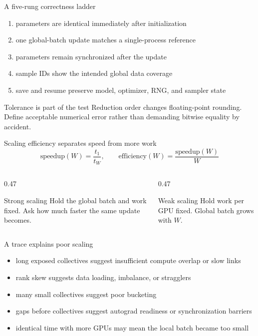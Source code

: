 \documentclass[handout]{beamer}
\begin{document}
\begin{frame}{A five-rung correctness ladder}
  \begin{enumerate}
    \setlength{\itemsep}{5pt}
    \item parameters are identical immediately after initialization
    \item one global-batch update matches a single-process reference
    \item parameters remain synchronized after the update
    \item sample IDs show the intended global data coverage
    \item save and resume preserve model, optimizer, RNG, and sampler state
  \end{enumerate}
  \begin{alertblock}{Tolerance is part of the test}
    Reduction order changes floating-point rounding. Define acceptable numerical error rather than demanding bitwise equality by accident.
  \end{alertblock}
\end{frame}

\begin{frame}{Scaling efficiency separates speed from more work}
  \[
    \text{speedup}(W)=\frac{t_1}{t_W},
    \qquad
    \text{efficiency}(W)=\frac{\text{speedup}(W)}{W}
  \]
  \begin{columns}[t]
    \begin{column}{0.47\linewidth}
      \begin{block}{Strong scaling}
        Hold the global batch and work fixed. Ask how much faster the same update becomes.
      \end{block}
    \end{column}
    \begin{column}{0.47\linewidth}
      \begin{block}{Weak scaling}
        Hold work per GPU fixed. Global batch grows with $W$.
      \end{block}
    \end{column}
  \end{columns}
\end{frame}

\begin{frame}{A trace explains poor scaling}
  \begin{itemize}
    \setlength{\itemsep}{7pt}
    \item long exposed collectives suggest insufficient compute overlap or slow links
    \item rank skew suggests data loading, imbalance, or stragglers
    \item many small collectives suggest poor bucketing
    \item gaps before collectives suggest autograd readiness or synchronization barriers
    \item identical time with more GPUs may mean the local batch became too small
  \end{itemize}
\end{frame}
\end{document}
